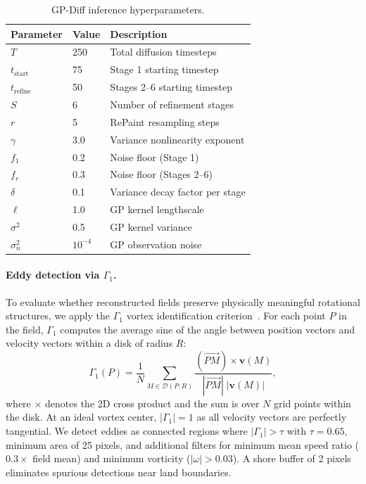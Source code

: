 \documentclass{article}
\begin{document}
\begin{table}[t]
\centering
\caption{GP-Diff inference hyperparameters.}
\label{tab:hyperparams}
\begin{tabular}{lll}
\toprule
\textbf{Parameter} & \textbf{Value} & \textbf{Description} \\
\midrule
$T$ & 250 & Total diffusion timesteps \\
$t_{\text{start}}$ & 75 & Stage 1 starting timestep \\
$t_{\text{refine}}$ & 50 & Stages 2--6 starting timestep \\
$S$ & 6 & Number of refinement stages \\
$r$ & 5 & RePaint resampling steps \\
$\gamma$ & 3.0 & Variance nonlinearity exponent \\
$f_1$ & 0.2 & Noise floor (Stage 1) \\
$f_r$ & 0.3 & Noise floor (Stages 2--6) \\
$\delta$ & 0.1 & Variance decay factor per stage \\
\midrule
$\ell$ & 1.0 & GP kernel lengthscale \\
$\sigma^2$ & 0.5 & GP kernel variance \\
$\sigma_n^2$ & $10^{-4}$ & GP observation noise \\
\bottomrule
\end{tabular}
\end{table}

\paragraph{Eddy detection via $\Gamma_1$.}
To evaluate whether reconstructed fields preserve physically meaningful rotational structures, we apply the $\Gamma_1$ vortex identification criterion~\citep{graftieaux2001combining}. For each point $P$ in the field, $\Gamma_1$ computes the average sine of the angle between position vectors and velocity vectors within a disk of radius $R$:
\begin{equation}
    \Gamma_1(P) = \frac{1}{N} \sum_{M \in \mathcal{D}(P, R)} \frac{(\overrightarrow{PM}) \times \mathbf{v}(M)}{|\overrightarrow{PM}|\;|\mathbf{v}(M)|},
    \label{eq:gamma1}
\end{equation}
where $\times$ denotes the 2D cross product and the sum is over $N$ grid points within the disk. At an ideal vortex center, $|\Gamma_1| = 1$ as all velocity vectors are perfectly tangential. We detect eddies as connected regions where $|\Gamma_1| > \tau$ with $\tau = 0.65$, minimum area of 25 pixels, and additional filters for minimum mean speed ratio ($0.3\times$ field mean) and minimum vorticity ($|\omega| > 0.03$). A shore buffer of 2 pixels eliminates spurious detections near land boundaries.
\end{document}
